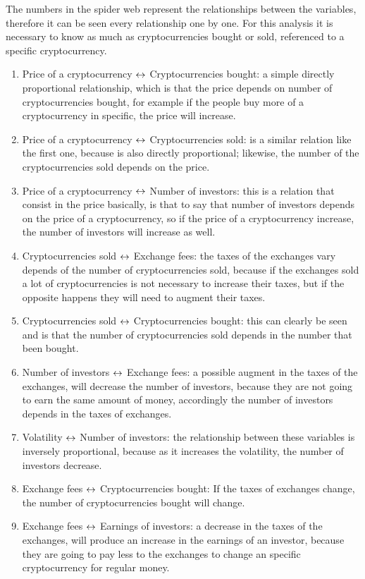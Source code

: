 \noindent The numbers in the spider web represent the relationships between the variables, therefore it can be seen every relationship one by one.
For this analysis it is necessary to know as much as cryptocurrencies bought or sold, referenced to a specific cryptocurrency.
\begin{enumerate}
  \item Price of a cryptocurrency $\leftrightarrow$ Cryptocurrencies bought: a simple directly proportional relationship, which is that the price depends on number of cryptocurrencies bought, for example if the people buy more of a cryptocurrency in specific, the price will increase. 
  \item Price of a cryptocurrency $\leftrightarrow$ Cryptocurrencies sold: is a similar relation like the first one, because is also directly proportional; likewise, the number of the cryptocurrencies sold depends on the price.
  \item Price of a cryptocurrency $\leftrightarrow$ Number of investors: this is a relation that consist in the price basically, is that to say that number of investors depends on the price of a cryptocurrency, so if the price of a cryptocurrency increase, the number of investors will increase as well.
  \item Cryptocurrencies sold $\leftrightarrow$ Exchange fees: the taxes of the exchanges vary depends of the number of cryptocurrencies sold, because if the exchanges sold a lot of cryptocurrencies is not necessary to increase their taxes, but if the opposite happens they will need to augment their taxes.
  \item Cryptocurrencies sold $\leftrightarrow$ Cryptocurrencies bought: this can clearly be seen and is that the number of cryptocurrencies sold depends in the number that been bought.
  \item Number of investors $\leftrightarrow$ Exchange fees: a possible augment in the taxes of the exchanges, will decrease the number of investors, because they are not going to earn the same amount of money, accordingly the number of investors depends in the taxes of exchanges.  
  \item Volatility $\leftrightarrow$ Number of investors: the relationship between these variables is inversely proportional, because as it increases the volatility, the number of investors decrease. 
  \item Exchange fees $\leftrightarrow$ Cryptocurrencies bought: If the taxes of exchanges change, the number of cryptocurrencies bought will change.
  \item Exchange fees $\leftrightarrow$ Earnings of investors: a decrease in the taxes of the exchanges, will produce an increase in the earnings of an investor, because they are going to pay less to the exchanges to change an specific cryptocurrency for regular money.  

\end{enumerate}
